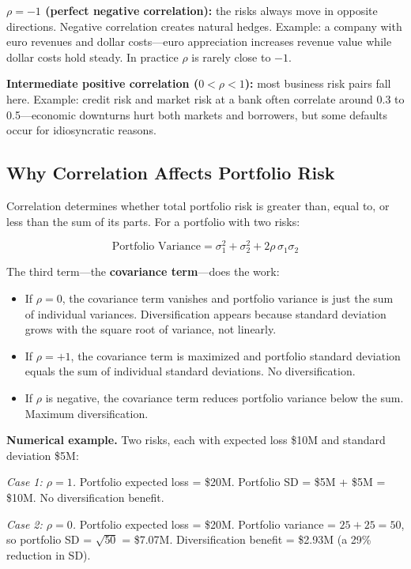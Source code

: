 \documentclass[11pt,openany]{book}
\providecommand{\tightlist}{\setlength{\itemsep}{0pt}\setlength{\parskip}{0pt}}
\begin{document}
\textbf{\(\rho = -1\) (perfect negative correlation):} the risks always move
in opposite directions. Negative correlation creates natural hedges. Example:
a company with euro revenues and dollar costs---euro appreciation increases
revenue value while dollar costs hold steady. In practice \(\rho\) is rarely
close to \(-1\).

\textbf{Intermediate positive correlation (\(0 < \rho < 1\)):} most business
risk pairs fall here. Example: credit risk and market risk at a bank often
correlate around 0.3 to 0.5---economic downturns hurt both markets and
borrowers, but some defaults occur for idiosyncratic reasons.

\subsection{Why Correlation Affects Portfolio Risk}
\label{subsec:correlation-portfolio-risk}

Correlation determines whether total portfolio risk is greater than, equal to,
or less than the sum of its parts. For a portfolio with two risks:

\[
\text{Portfolio Variance} = \sigma_1^2 + \sigma_2^2 + 2\rho\,\sigma_1\sigma_2
\]

The third term---the \textbf{covariance term}---does the work:

\begin{itemize}\tightlist
  \item If \(\rho = 0\), the covariance term vanishes and portfolio variance
        is just the sum of individual variances. Diversification appears
        because standard deviation grows with the square root of variance, not
        linearly.
  \item If \(\rho = +1\), the covariance term is maximized and portfolio
        standard deviation equals the sum of individual standard deviations.
        No diversification.
  \item If \(\rho\) is negative, the covariance term reduces portfolio
        variance below the sum. Maximum diversification.
\end{itemize}

\textbf{Numerical example.} Two risks, each with expected loss \$10M and
standard deviation \$5M:

\emph{Case 1: \(\rho = 1\).} Portfolio expected loss = \$20M. Portfolio SD =
\$5M + \$5M = \$10M. No diversification benefit.

\emph{Case 2: \(\rho = 0\).} Portfolio expected loss = \$20M. Portfolio
variance = \(25 + 25 = 50\), so portfolio SD = \(\sqrt{50}\) = \$7.07M.
Diversification benefit = \$2.93M (a 29\% reduction in SD).
\end{document}
